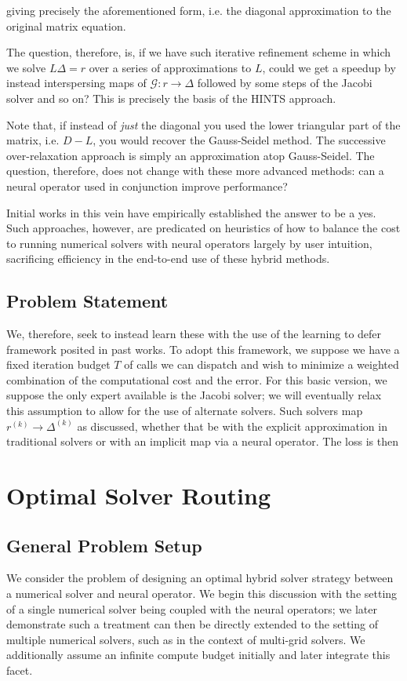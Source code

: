 \documentclass[12pt]{article}
\begin{document}
giving precisely the aforementioned form, i.e. the diagonal approximation to the original matrix equation. 

The question, therefore, is, if we have such iterative refinement scheme in which we solve $L \Delta = r$ over a series of approximations to $L$, could we get a speedup by instead interspersing maps of $\mathcal{G} : r\to\Delta$ followed by some steps of the Jacobi solver and so on? This is precisely the basis of the HINTS approach. 

Note that, if instead of \textit{just} the diagonal you used the lower triangular part of the matrix, i.e. $D - L$, you would recover the Gauss-Seidel method. The successive over-relaxation approach is simply an approximation atop Gauss-Seidel. The question, therefore, does not change with these more advanced methods: can a neural operator used in conjunction improve performance?

Initial works in this vein have empirically established the answer to be a yes. Such approaches, however, are predicated on heuristics of how to balance the cost to running numerical solvers with neural operators largely by user intuition, sacrificing efficiency in the end-to-end use of these hybrid methods.

\subsection{Problem Statement}
We, therefore, seek to instead learn these with the use of the learning to defer framework posited in past works. To adopt this framework, we suppose we have a fixed iteration budget $T$ of calls we can dispatch and wish to minimize a weighted combination of the computational cost and the error. For this basic version, we suppose the only expert available is the Jacobi solver; we will eventually relax this assumption to allow for the use of alternate solvers. Such solvers map $r^{(k)}\to\Delta^{(k)}$ as discussed, whether that be with the explicit approximation in traditional solvers or with an implicit map via a neural operator. The loss is then 

\newpage
\section{Optimal Solver Routing}
\subsection{General Problem Setup}
We consider the problem of designing an optimal hybrid solver strategy between a numerical solver and neural operator. We begin this discussion with the setting of a single numerical solver being coupled with the neural operators; we later demonstrate such a treatment can then be directly extended to the setting of multiple numerical solvers, such as in the context of multi-grid solvers. We additionally assume an infinite compute budget initially and later integrate this facet. 
\end{document}
